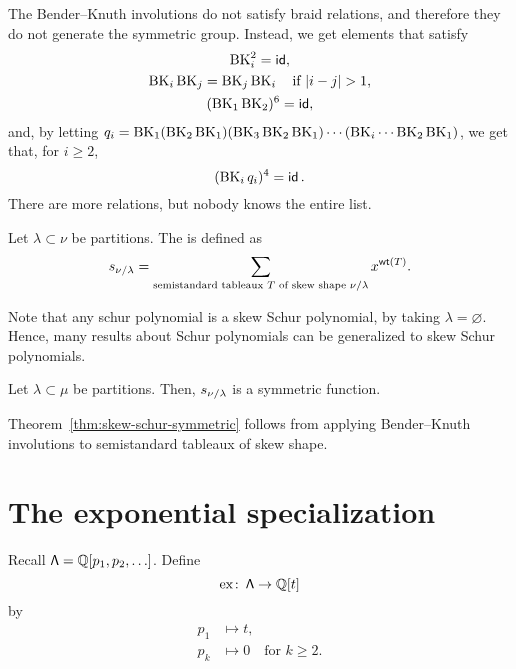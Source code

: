 \begin{remark}
    The Bender--Knuth involutions do not satisfy braid relations,
    and therefore they do not generate the symmetric group.
    Instead, we get elements that satisfy
    \begin{gather}
        \operatorname{BK}_{i}^2 = \operatorname{\mathsf{id}}, \\
        \operatorname{BK}_{i} \operatorname{BK}_{j} = \operatorname{BK}_{j} \operatorname{BK}_{i} \quad \text{if } |i - j| > 1, \\
        (\operatorname{BK}_{1} \operatorname{BK}_{2})^6 = \operatorname{\mathsf{id}},
    \end{gather}
    and, by letting \(q_i =
    \operatorname{BK}_{1}
    (\operatorname{BK}_{2} \operatorname{BK}_{1})
    (\operatorname{BK}_{3} \operatorname{BK}_{2} \operatorname{BK}_{1})
    \cdots
    (\operatorname{BK}_{i} \cdots \operatorname{BK}_{2} \operatorname{BK}_{1})\),
    we get that, for \(i \geq 2\),
    \begin{equation}
        (\operatorname{BK}_{i} q_i)^4 = \operatorname{\mathsf{id}}.
    \end{equation}
    There are more relations, but nobody knows the entire list.
\end{remark}

\begin{definition} \label{def:skew-schur}
    Let \(\lambda \subset \nu\) be partitions.
    The  is defined as
    \begin{equation}
        s_{\nu / \lambda} = \sum_{\text{semistandard tableaux } T \text{ of skew shape } \nu / \lambda} x^{\operatorname{\mathsf{wt}}(T)}.
    \end{equation}
\end{definition}

Note that any schur polynomial is a skew Schur polynomial, by taking \(\lambda = \varnothing\).
Hence, many results about Schur polynomials can be generalized to skew Schur polynomials.

\begin{theorem} \label{thm:skew-schur-symmetric}
    Let \(\lambda \subset \mu\) be partitions.
    Then, \(s_{\nu / \lambda}\) is a symmetric function.
\end{theorem}

Theorem~\ref{thm:skew-schur-symmetric} follows from applying Bender--Knuth involutions to semistandard tableaux of skew shape.

\section{The exponential specialization}

Recall \(\operatorname{\mathsf{\Lambda}} = \mathbb{Q}[p_1, p_2, \ldots]\).
Define
\begin{equation}
    \operatorname{ex} \colon \operatorname{\mathsf{\Lambda}} \to \mathbb{Q}[t]
\end{equation}
by
\begin{align}
    p_1 &\mapsto t, \\
    p_k &\mapsto 0 \quad \text{for } k \geq 2.
\end{align}

